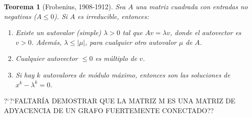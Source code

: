 \documentclass[size=a4, parskip=half, titlepage=false, toc=flat, toc=bib, 12pt]{scrartcl}
\theoremstyle{theorem-style}
\newtheorem{nth}{Teorema}[section]
\theoremstyle{definition-style}
\theoremstyle{remark-style}
\theoremstyle{example-style}
\theoremstyle{definition-style}
\theoremstyle{remark-style}
\begin{document}
\begin{nth}[Frobenius, 1908-1912]
Sea $A $ una matriz cuadrada con entradas no negativas ($A \leq 0$). Si $A$ es irreducible, entonces:
\begin{enumerate}
\item Existe un autovalor (simple) $\lambda > 0$ tal que $A v = \lambda v$, donde el autovector es
$v > 0$. Además, $\lambda \leq |\mu|$, para cualquier otro autovalor $\mu$ de $A$.
\item Cualquier autovector $\leq 0$ es múltiplo de $v$.
\item Si hay $k$ autovalores de módulo máximo, entonces son las soluciones de $x^k - \lambda^k = 0$.
\end{enumerate}
\end{nth}

?`?`FALTARÍA DEMOSTRAR QUE LA MATRIZ M ES UNA MATRIZ DE ADYACENCIA DE UN GRAFO FUERTEMENTE CONECTADO??
\end{document}
